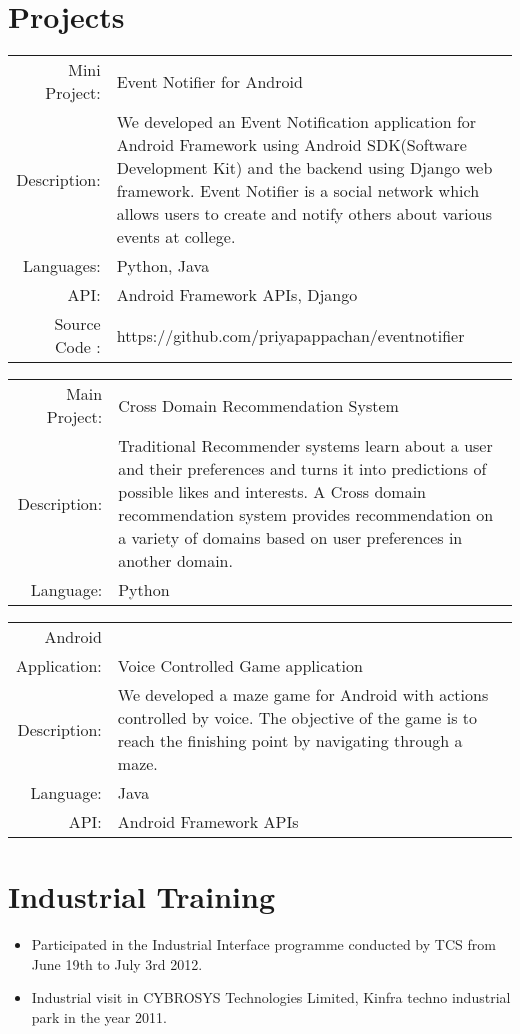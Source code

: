 \documentclass[a4paper,10pt]{article}
\begin{document}
\section{Projects}
\begin{tabular}{r p{11cm} }

Mini Project: & Event Notifier for Android\\
Description: & We developed an Event Notification application for Android Framework using Android SDK(Software Development Kit) and the backend using Django web framework. Event Notifier is a social network which allows users to create and notify others about various events at college.\\
Languages:& Python, Java\\
API: & Android Framework APIs, Django\\
Source Code : & https://github.com/priyapappachan/eventnotifier
\end{tabular}

\begin{tabular}{r p{11cm} }

Main Project: & Cross Domain Recommendation System\\
Description: & Traditional Recommender systems learn about a user and their preferences and turns it into predictions of possible likes and interests. A Cross domain recommendation system provides recommendation on a variety of domains based on user preferences in another domain. \\
Language:& Python\\
\end{tabular}

\begin{tabular}{r p{11cm} }

Android \\Application: & Voice Controlled Game application\\
Description: & We developed a maze game for Android with actions controlled by voice. The objective of the game is to reach the finishing point by navigating through a maze.  \\
Language:& Java\\
API: & Android Framework APIs 

\end{tabular}

\section{Industrial Training}
\begin{itemize}
\item Participated in the Industrial Interface programme conducted by TCS from June 19th to July 3rd 2012. 
\item Industrial visit in CYBROSYS Technologies Limited, Kinfra techno industrial park in the year 2011.
\end{itemize}
\end{document}
